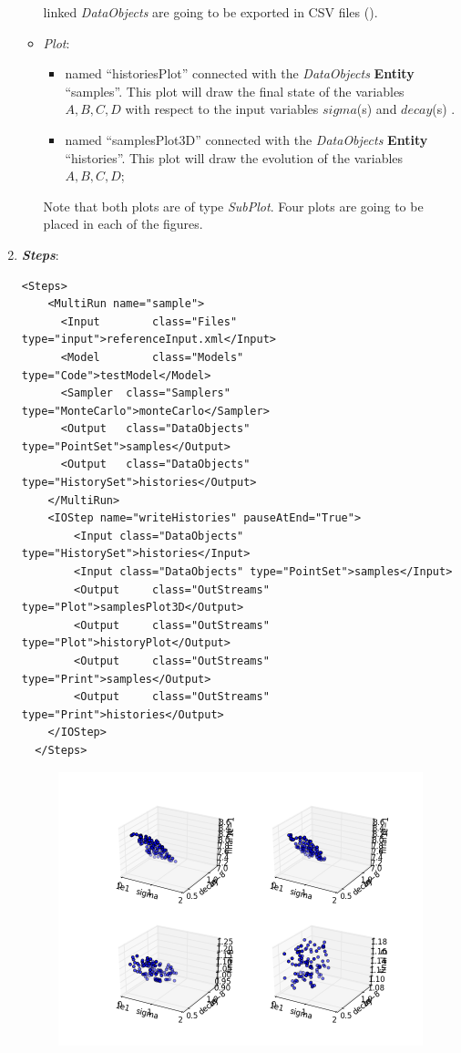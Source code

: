 \begin{enumerate}
\begin{itemize}
      linked  \textit{DataObjects} are going 
    to be exported in CSV files ().
    \item \textit{Plot}: 
    \begin{itemize}
      \item named ``historiesPlot'' connected with the  \textit{DataObjects} 
      \textbf{Entity} ``samples''.  This plot will draw the final state of the
      variables $A,B,C,D$ with respect to the input variables $sigma$(s) 
      and $decay$(s) . 
      \item named ``samplesPlot3D'' connected with the  
      \textit{DataObjects} \textbf{Entity} ``histories''. This plot will draw the 
      evolution of the variables $A,B,C,D$;
    \end{itemize}
     Note that both plots are of type \textit{SubPlot}. Four plots
     are going to be placed in each of the figures.
  \end{itemize}   
   \item \textbf{\textit{Steps}}:   
\begin{lstlisting}[style=XML,morekeywords={arg,extension,pauseAtEnd,overwrite}]
  <Steps>
    <MultiRun name="sample">
      <Input 	    class="Files" 			 type="input">referenceInput.xml</Input>
      <Model 	    class="Models" 		 type="Code">testModel</Model>
      <Sampler 	class="Samplers" 		 type="MonteCarlo">monteCarlo</Sampler>
      <Output 	class="DataObjects"  type="PointSet">samples</Output>
      <Output 	class="DataObjects"  type="HistorySet">histories</Output>
    </MultiRun>
    <IOStep name="writeHistories" pauseAtEnd="True">
        <Input class="DataObjects" type="HistorySet">histories</Input>
        <Input class="DataObjects" type="PointSet">samples</Input>
        <Output 	class="OutStreams" type="Plot">samplesPlot3D</Output>
        <Output 	class="OutStreams" type="Plot">historyPlot</Output>
        <Output 	class="OutStreams" type="Print">samples</Output>
        <Output 	class="OutStreams" type="Print">histories</Output>
    </IOStep>
  </Steps>
\end{lstlisting}
 \begin{figure}[h!]
  \centering
  \includegraphics[scale=0.7]{pics/MC_pointsets.png}

\end{figure}
\end{enumerate}
